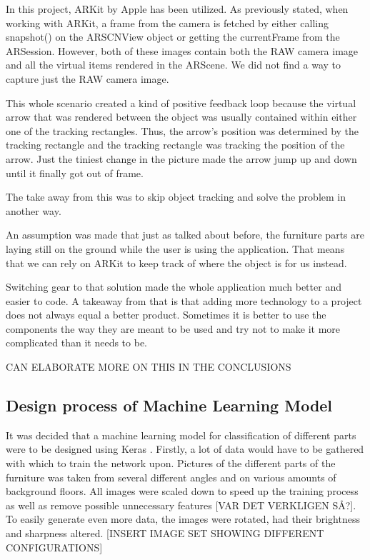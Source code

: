 In this project, ARKit by Apple has been utilized. As previously stated, when working with ARKit, a frame from the camera is fetched by either calling snapshot() on the ARSCNView object or getting the currentFrame from the ARSession.
However, both of these images contain both the RAW camera image and all the virtual items rendered in the ARScene. We did not find a way to capture just the RAW camera image.

This whole scenario created a kind of positive feedback loop because the virtual arrow that was rendered between the object was usually contained within either one of the tracking rectangles. Thus, the arrow's position was determined by the tracking rectangle and the tracking rectangle was tracking the position of the arrow.
Just the tiniest change in the picture made the arrow jump up and down until it finally got out of frame.

The take away from this was to skip object tracking and solve the problem in another way.

An assumption was made that just as talked about before, the furniture parts are laying still on the ground while the user is using the application. That means that we can rely on ARKit to keep track of where the object is for us instead.

Switching gear to that solution made the whole application much better and easier to code. A takeaway from that is that adding more technology to a project does not always equal a better product. Sometimes it is better to use the components the way they are meant to be used and try not to make it more complicated than it needs to be.

CAN ELABORATE MORE ON THIS IN THE CONCLUSIONS


\subsection{Design process of Machine Learning Model}
It was decided that a machine learning model for classification of different parts were to be designed using Keras \cite{keras}. Firstly, a lot of data would have to be gathered with which to train the network upon. Pictures of the different parts of the furniture was taken from several different angles and on various amounts of background floors. 
All images were scaled down to speed up the training process as well as remove possible unnecessary features [VAR DET VERKLIGEN SÅ?]. To easily generate even more data, the images were rotated, had their brightness and sharpness altered. 
[INSERT IMAGE SET SHOWING DIFFERENT CONFIGURATIONS]
 

